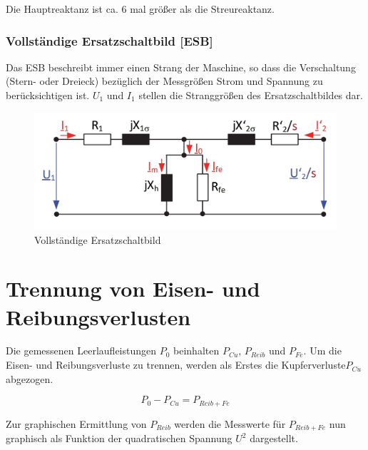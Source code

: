 \documentclass[conference]{IEEEtran}
\begin{document}
Die Hauptreaktanz ist ca. 6 mal größer als die Streureaktanz.

\subsubsection{Vollständige Ersatzschaltbild [ESB]}

Das ESB beschreibt immer einen Strang der Maschine, so dass die Verschaltung
(Stern- oder Dreieck) bezüglich der Messgrößen Strom und Spannung zu
berücksichtigen ist. $U_1$ und $I_1$ stellen die Stranggrößen des
Ersatzschaltbildes dar.

\begin{figure}[htbp]
    \centering
    \includegraphics[width=\columnwidth]{./figures/Vollstaendiges_ESB.jpg}
    \caption{Vollständige Ersatzschaltbild}
    \label{fig:ESB_Vollstaendig}
\end{figure}

\section{Trennung von Eisen- und Reibungsverlusten}

Die gemessenen Leerlaufleistungen $P_{0}$ beinhalten $P_{Cu}$, $P_{Reib}$ und
$P_{Fe}$. Um die Eisen- und Reibungsverluste zu trennen, werden als Erstes die
Kupferverluste$ P_{Cu}$ abgezogen.

\begin{equation}
    P_{0} - P_{Cu} = P_{Reib+Fe}
    \label{eq:P_reib_fe}
\end{equation}



Zur graphischen Ermittlung von $P_{Reib}$ werden die Messwerte für
$P_{Reib+Fe}$ nun graphisch als Funktion der quadratischen Spannung $U^2$
dargestellt.
\end{document}
